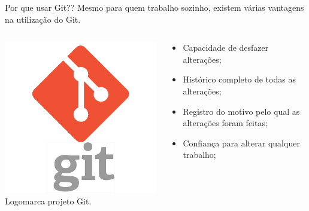 \documentclass{beamer}
\begin{document}
\begin{frame}{Por que usar Git??}
   Mesmo para quem trabalho sozinho, existem várias vantagens na 
utilização do Git.
  \begin{columns}
    \begin{column}{0.3\textwidth}
       \includegraphics[height=0.4\paperheight]{fig/aula3/git_logo.png} \\
       \tiny{Logomarca projeto Git}.
    \end{column}
    \begin{column}{0.5\textwidth}
      \begin{itemize}
        \item Capacidade de desfazer alterações;
	 \item Histórico completo de todas as alterações;
	 \item Registro do motivo pelo qual as alterações foram feitas;
	 \item Confiança para alterar qualquer trabalho;
      \end{itemize} 
    \end{column}    
  \end{columns}
\end{frame}
\end{document}
